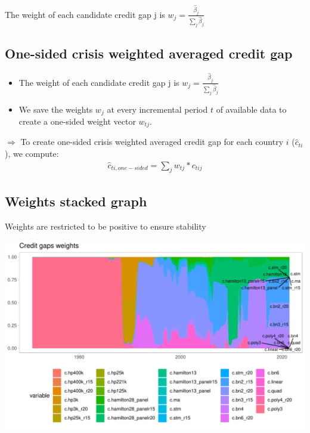 \documentclass[
  12pt,
]{article}
\begin{document}
The weight of each candidate credit gap j is \(w_j = \frac{\hat{\beta}_j}{\sum\nolimits_j\hat{\beta}_j}\)

\hypertarget{one-sided-crisis-weighted-averaged-credit-gap}{%
\subsection{One-sided crisis weighted averaged credit gap}\label{one-sided-crisis-weighted-averaged-credit-gap}}

\begin{itemize}
\item
  The weight of each candidate credit gap j is \(w_j = \frac{\hat{\beta}_j}{\sum\nolimits_j\hat{\beta}_j}\)
\item
  We save the weights \(w_j\) at every incremental period \(t\) of available data to create a one-sided weight vector \(w_{tj}\).
\end{itemize}

\(\Rightarrow\) To create one-sided crisis weighted averaged credit gap for each country \(i\) (\(\hat{c}_{ti}\)), we compute:
\begin{align}
\hat{c}_{ti,one-sided} = \sum\nolimits_{j} w_{tj} * c_{tij}
\end{align}

\hypertarget{weights-stacked-graph}{%
\subsection{Weights stacked graph}\label{weights-stacked-graph}}

Weights are restricted to be positive to ensure stability

\begin{center}\includegraphics[width=1\linewidth]{../Data/Output/Graphs/Weights_stack} \end{center}
\end{document}
